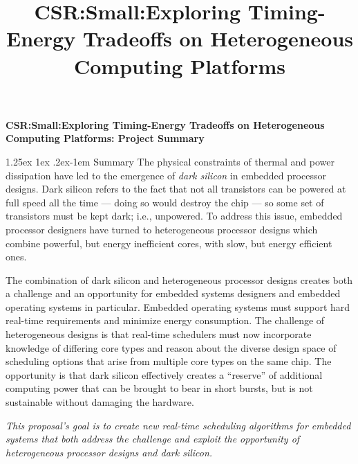 \documentclass[10pt,letterpaper]{article}
\title{\textbf{CSR:Small:Exploring Timing-Energy Tradeoffs on Heterogeneous Computing Platforms}}
\date{\vspace{4mm}}
\makeatletter
\renewcommand{\paragraph}{%
  \@startsection{paragraph}{4}%
  {\z@}{1.25ex \@plus 1ex \@minus .2ex}{-1em}%
  {\normalfont\normalsize\bfseries}%
}
\makeatother
\begin{document}




\thispagestyle{empty}


\begin{center}
\Large{\textbf{CSR:Small:Exploring Timing-Energy Tradeoffs on Heterogeneous Computing Platforms: Project Summary}}
\end{center}

\paragraph{Summary}
The physical constraints of thermal and power dissipation have led to
the emergence of \emph{dark silicon} in embedded processor designs.
Dark silicon refers to the fact that not all transistors can be
powered at full speed all the time --- doing so would destroy the chip
--- so some set of transistors must be kept dark; i.e., unpowered.  To
address this issue, embedded processor designers have turned to
heterogeneous processor designs which combine powerful, but energy
inefficient cores, with slow, but energy efficient ones.

The combination of dark silicon and heterogeneous processor designs
creates both a challenge and an opportunity for embedded systems
designers and embedded operating systems in particular.  Embedded
operating systems must support hard real-time requirements and
minimize energy consumption.  The challenge of heterogeneous designs
is that real-time schedulers must now incorporate knowledge of
differing core types and reason about the diverse design space of
scheduling options that arise from multiple core types on the same
chip.  The opportunity is that dark silicon effectively creates a
``reserve'' of additional computing power that can be brought to bear
in short bursts, but is not sustainable without damaging the hardware.

\emph{This proposal's goal is to create new real-time scheduling
  algorithms for embedded systems that both address the challenge and
  exploit the opportunity of heterogeneous processor designs and dark
  silicon.}
\end{document}
